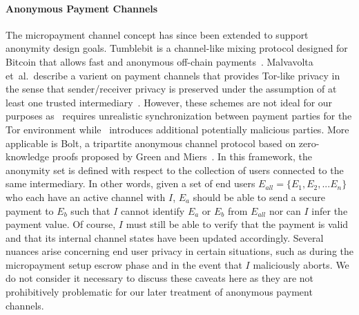 
\paragraph*{Anonymous Payment Channels} The micropayment channel concept has
since been extended to support anonymity design goals. Tumblebit is a
channel-like mixing protocol designed for Bitcoin that allows fast and
anonymous off-chain payments~\cite{heilman2017tumblebit}. Malvavolta
et\ al.\ describe a varient on payment channels that provides Tor-like
privacy in the sense that sender/receiver privacy is preserved under
the assumption of at least one trusted
intermediary~\cite{malavolta2017concurrency}. However, these schemes
are not ideal for our purposes as~\cite{heilman2017tumblebit} requires
unrealistic synchronization between payment parties for the Tor
environment while~\cite{malavolta2017concurrency} introduces
additional potentially malicious parties. More applicable is Bolt, a
tripartite anonymous channel protocol based on zero-knowledge proofs
proposed by Green and Miers~\cite{green2017bolt}. In this framework,
the anonymity set is defined with respect to the collection of users
connected to the same intermediary. In other words, given a set of end
users $E_{all} = \{E_1, E_2, ... E_n\}$ who each have an active
channel with $I$, $E_a$ should be able to send a secure payment to
$E_b$ such that $I$ cannot identify $E_a$ or $E_b$ from $E_{all}$ nor
can $I$ infer the payment value. Of course, $I$ must still be able to
verify that the payment is valid and that its internal channel states
have been updated accordingly. Several nuances arise concerning end
user privacy in certain situations, such as during the micropayment
setup escrow phase and in the event that $I$ maliciously aborts. We do
not consider it necessary to discuss these caveats here as they are
not prohibitively problematic for our later treatment of anonymous
payment channels.

